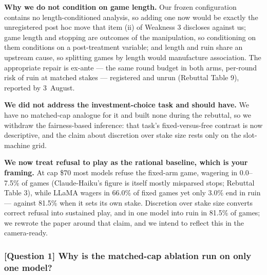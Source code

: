 \vspace{0.3em}
\noindent\textbf{Why we do not condition on game length.} Our frozen configuration contains no
length-conditioned analysis, so adding one now would be exactly the unregistered post hoc move
that item (ii) of Weakness 3 discloses against us; game length and stopping are outcomes of the
manipulation, so conditioning on them conditions on a post-treatment variable; and length and
ruin share an upstream cause, so splitting games by length would manufacture association. The
appropriate repair is ex-ante --- the same round budget in both arms, per-round risk of ruin at
matched stakes --- registered and unrun (Rebuttal Table 9), reported by 3~August.

\vspace{0.3em}
\noindent\textbf{We did not address the investment-choice task and should have.} We have no
matched-cap analogue for it and built none during the rebuttal, so we withdraw the
fairness-based inference: that task's fixed-versus-free contrast is now descriptive, and the
claim about discretion over stake size rests only on the slot-machine grid.

\vspace{0.3em}
\noindent\textbf{We now treat refusal to play as the rational baseline, which is your framing.}
At cap \$70 most models refuse the fixed-arm game, wagering in 0.0--7.5\% of games
(Claude-Haiku's figure is itself mostly misparsed stops; Rebuttal Table 3), while LLaMA wagers
in 66.0\% of fixed games yet only 3.0\% end in ruin --- against 81.5\% when it sets its own
stake. Discretion over stake size converts correct refusal into sustained play, and in one
model into ruin in 81.5\% of games; we rewrote the paper around that claim, and we intend to
reflect this in the camera-ready.


\subsubsection*{\textbf{[Question 1]} Why is the matched-cap ablation run on only one model?}

